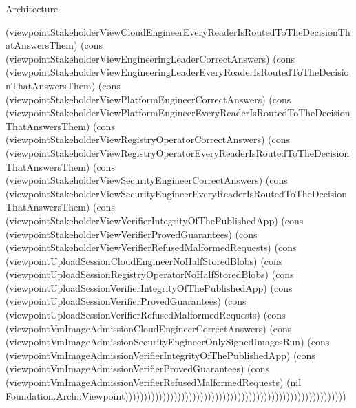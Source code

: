 \begin{lexlean}{Architecture}
\begin{semanticmodule}
{(viewpointStakeholderViewCloudEngineerEveryReaderIsRoutedToTheDecisionThatAnswersThem) (cons (viewpointStakeholderViewEngineeringLeaderCorrectAnswers) (cons (viewpointStakeholderViewEngineeringLeaderEveryReaderIsRoutedToTheDecisionThatAnswersThem) (cons (viewpointStakeholderViewPlatformEngineerCorrectAnswers) (cons (viewpointStakeholderViewPlatformEngineerEveryReaderIsRoutedToTheDecisionThatAnswersThem) (cons (viewpointStakeholderViewRegistryOperatorCorrectAnswers) (cons (viewpointStakeholderViewRegistryOperatorEveryReaderIsRoutedToTheDecisionThatAnswersThem) (cons (viewpointStakeholderViewSecurityEngineerCorrectAnswers) (cons (viewpointStakeholderViewSecurityEngineerEveryReaderIsRoutedToTheDecisionThatAnswersThem) (cons (viewpointStakeholderViewVerifierIntegrityOfThePublishedApp) (cons (viewpointStakeholderViewVerifierProvedGuarantees) (cons (viewpointStakeholderViewVerifierRefusedMalformedRequests) (cons (viewpointUploadSessionCloudEngineerNoHalfStoredBlobs) (cons (viewpointUploadSessionRegistryOperatorNoHalfStoredBlobs) (cons (viewpointUploadSessionVerifierIntegrityOfThePublishedApp) (cons (viewpointUploadSessionVerifierProvedGuarantees) (cons (viewpointUploadSessionVerifierRefusedMalformedRequests) (cons (viewpointVmImageAdmissionCloudEngineerCorrectAnswers) (cons (viewpointVmImageAdmissionSecurityEngineerOnlySignedImagesRun) (cons (viewpointVmImageAdmissionVerifierIntegrityOfThePublishedApp) (cons (viewpointVmImageAdmissionVerifierProvedGuarantees) (cons (viewpointVmImageAdmissionVerifierRefusedMalformedRequests) (nil Foundation.Arch::Viewpoint)))))))))))))))))))))))))))))))))))))))))))))))))))))))))))
}


\end{semanticmodule}
\end{lexlean}
